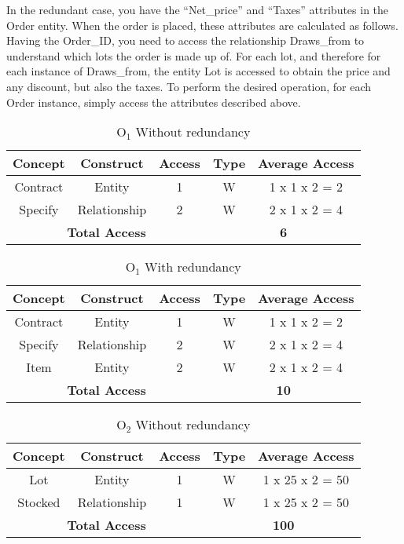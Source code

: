 In the redundant case, you have the ``Net\_price'' and ``Taxes'' attributes in the Order entity. When the order is placed, these attributes are calculated as follows. Having the Order\_ID, you need to access the relationship Draws\_from to understand which lots the order is made up of. For each lot, and therefore for each instance of Draws\_from, the entity Lot is accessed to obtain the price and any discount, but also the taxes. To perform the desired operation, for each Order instance, simply access the attributes described above.
\begin{table}[!h]\caption{	$ \textrm{O}_\textrm{1} $ Without redundancy}
	\begin{center}
		\begin{tabular}{| c | c | c | c | c |}
			\hline
			\textbf{Concept} & \textbf{Construct} & \textbf{Access} & \textbf{Type} & \textbf{Average Access} \\ \hline
			Contract & Entity & 1 & W & 1 x 1 x 2 = 2 \\ \hline
			Specify & Relationship & 2 & W & 2 x 1 x 2 = 4 \\ \hline
			\multicolumn{3}{|c|}{\textbf{Total Access}} & \multicolumn{2}{|c|}{\textbf{6}} \\ \hline
		\end{tabular}
	\end{center}
\end{table}
\begin{table}[!h]\caption{	$ \textrm{O}_\textrm{1} $ With redundancy}
	\begin{center}
		\begin{tabular}{| c | c | c | c | c |}
			\hline
			\textbf{Concept} & \textbf{Construct} & \textbf{Access} & \textbf{Type} & \textbf{Average Access} \\ \hline
			Contract & Entity & 1 & W & 1 x 1 x 2 = 2 \\ \hline
			Specify & Relationship & 2 & W & 2 x 1 x 2 = 4 \\ \hline
			Item & Entity & 2 & W & 2 x 1 x 2 = 4 \\ \hline
			\multicolumn{3}{|c|}{\textbf{Total Access}} & \multicolumn{2}{|c|}{\textbf{10}} \\ \hline
		\end{tabular}
	\end{center}
\end{table}
\begin{table}[!h]\caption{	$ \textrm{O}_\textrm{2} $ Without redundancy}
	\begin{center}
		\begin{tabular}{| c | c | c | c | c |}
			\hline
			\textbf{Concept} & \textbf{Construct} & \textbf{Access} & \textbf{Type} & \textbf{Average Access} \\ \hline
			Lot & Entity & 1 & W & 1 x 25 x 2 = 50 \\ \hline
			Stocked & Relationship & 1 & W & 1 x 25 x 2 = 50 \\ \hline
			\multicolumn{3}{|c|}{\textbf{Total Access}} & \multicolumn{2}{|c|}{\textbf{100}} \\ \hline
		\end{tabular}
	\end{center}
\end{table}
